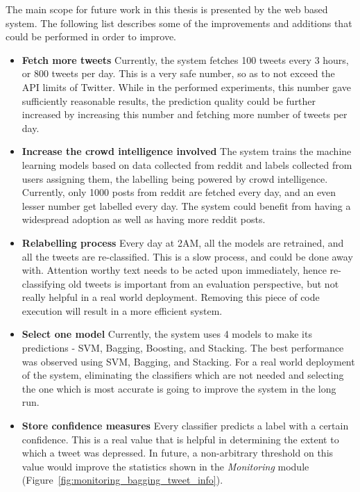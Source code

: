 The main scope for future work in this thesis is presented by the web based system. The following list describes some of the improvements and additions that could be performed in order to improve.\\

\begin{itemize}
    \item{\textbf{Fetch more tweets} Currently, the system fetches 100 tweets every 3 hours, or 800 tweets per day. This is a very safe number, so as to not exceed the API limits of Twitter. While in the performed experiments, this number gave sufficiently reasonable results, the prediction quality could be further increased by increasing this number and fetching more number of tweets per day.}
    \item{\textbf{Increase the crowd intelligence involved} The system trains the machine learning models based on data collected from reddit and labels collected from users assigning them, the labelling being powered by crowd intelligence. Currently, only 1000 posts from reddit are fetched every day, and an even lesser number get labelled every day. The system could benefit from having a widespread adoption as well as having more reddit posts.}
    \item{\textbf{Relabelling process} Every day at 2AM, all the models are retrained, and all the tweets are re-classified. This is a slow process, and could be done away with. Attention worthy text needs to be acted upon immediately, hence re-classifying old tweets is important from an evaluation perspective, but not really helpful in a real world deployment. Removing this piece of code execution will result in a more efficient system.}
    \item{\textbf{Select one model} Currently, the system uses 4 models to make its predictions - SVM, Bagging, Boosting, and Stacking. The best performance was observed using SVM, Bagging, and Stacking. For a real world deployment of the system, eliminating the classifiers which are not needed and selecting the one which is most accurate is going to improve the system in the long run.}
    \item{\textbf{Store confidence measures} Every classifier predicts a label with a certain confidence. This is a real value that is helpful in determining the extent to which a tweet was depressed. In future, a non-arbitrary threshold on this value would improve the statistics shown in the \emph{Monitoring} module (Figure~\ref{fig:monitoring_bagging_tweet_info}).}
\end{itemize}
